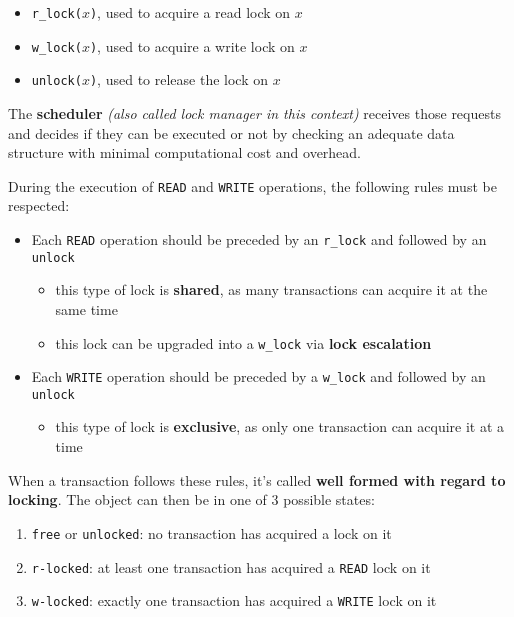 \documentclass[english]{article}
\begin{document}
\begin{itemize}[label=\textbf{\texttt{>}}]
  \item \texttt{r\_lock(\(x\))}, used to acquire a read lock on \(x\)
  \item \texttt{w\_lock(\(x\))}, used to acquire a write lock on \(x\)
  \item \texttt{unlock(\(x\))}, used to release the lock on \(x\)
\end{itemize}

The \textbf{scheduler} \textit{(also called lock manager in this context)} receives those requests and decides if they can be executed or not by checking an adequate data structure with minimal computational cost and overhead.

During the execution of \texttt{READ} and \texttt{WRITE} operations, the following rules must be respected:

\begin{itemize}
  \item Each \texttt{READ} operation should be preceded by an \texttt{r\_lock} and followed by an \texttt{unlock}
        \begin{itemize}
          \item this type of lock is \textbf{shared}, as many transactions can acquire it at the same time
          \item this lock can be upgraded into a \texttt{w\_lock} via \textbf{lock escalation}
        \end{itemize}
  \item Each \texttt{WRITE} operation should be preceded by a \texttt{w\_lock} and followed by an \texttt{unlock}
        \begin{itemize}
          \item this type of lock is \textbf{exclusive}, as only one transaction can acquire it at a time
        \end{itemize}
\end{itemize}

When a transaction follows these rules, it's called \textbf{well formed with regard to locking}.
The object can then be in one of \(3\) possible states:

\begin{enumerate}
  \item \texttt{free} or \texttt{unlocked}: no transaction has acquired a lock on it
  \item \texttt{r-locked}: at least one transaction has acquired a \texttt{READ} lock on it
  \item \texttt{w-locked}: exactly one transaction has acquired a \texttt{WRITE} lock on it
\end{enumerate}
\end{document}
